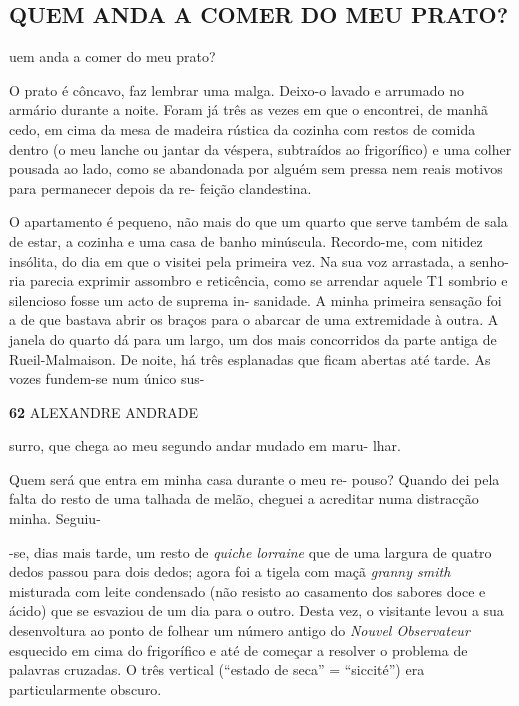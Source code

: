 \subsection{QUEM ANDA A COMER DO MEU
PRATO?}

uem anda a comer do meu prato?

O prato é côncavo, faz lembrar uma malga. Deixo-o lavado e arrumado no
armário durante a noite. Foram já três as vezes em que o encontrei, de
manhã cedo, em cima da mesa de madeira rústica da cozinha com restos de
comida dentro (o meu lanche ou jantar da véspera, subtraídos ao
frigorífico) e uma colher pousada ao lado, como se abandonada por alguém
sem pressa nem reais motivos para permanecer depois da re- feição
clandestina.

O apartamento é pequeno, não mais do que um quarto que serve também de
sala de estar, a cozinha e uma casa de banho minúscula. Recordo-me, com
nitidez insólita, do dia em que o visitei pela primeira vez. Na sua voz
arrastada, a senho- ria parecia exprimir assombro e reticência, como se
arrendar aquele T1 sombrio e silencioso fosse um acto de suprema in-
sanidade. A minha primeira sensação foi a de que bastava abrir os braços
para o abarcar de uma extremidade à outra. A janela do quarto dá para um
largo, um dos mais concorridos da parte antiga de Rueil-Malmaison. De
noite, há três esplanadas que ficam abertas até tarde. As vozes
fundem-se num único sus-

\textbf{62 }ALEXANDRE ANDRADE

surro, que chega ao meu segundo andar mudado em maru- lhar.

Quem será que entra em minha casa durante o meu re- pouso? Quando dei
pela falta do resto de uma talhada de melão, cheguei a acreditar numa
distracção minha. Seguiu-

-se, dias mais tarde, um resto de \emph{quiche lorraine }que de uma
largura de quatro dedos passou para dois dedos; agora foi a tigela com
maçã \emph{granny smith }misturada com leite condensado (não resisto ao
casamento dos sabores doce e ácido) que se esvaziou de um dia para o
outro. Desta vez, o visitante levou a sua desenvoltura ao ponto de
folhear um número antigo do \emph{Nouvel Observateur }esquecido em cima
do frigorífico e até de começar a resolver o problema de palavras
cruzadas. O três vertical (``estado de seca'' = ``siccité'') era
particularmente obscuro.

